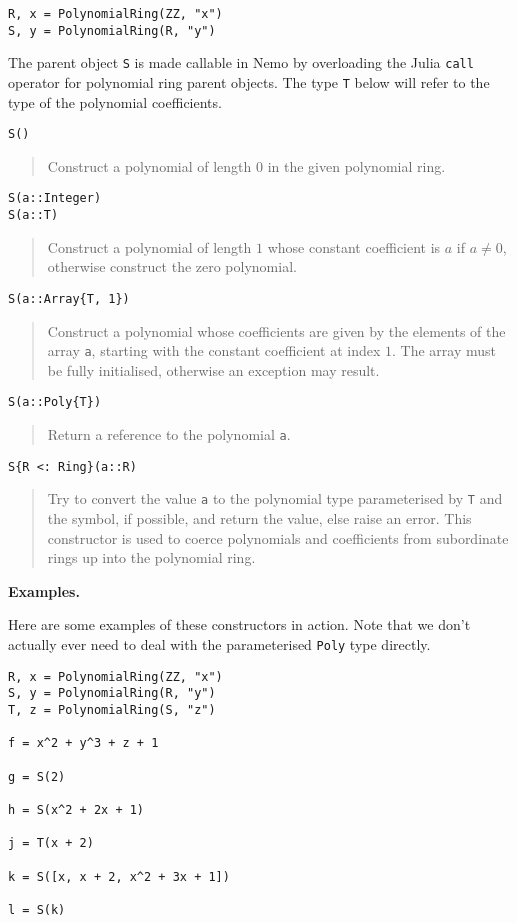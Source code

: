 \documentclass[a4paper,10pt]{article}
\newcommand{\code}{\lstinline}
\newcommand{\desc}[1]{\vspace{-3mm}\begin{quote}#1\end{quote}}
\begin{document}
\begin{lstlisting}
R, x = PolynomialRing(ZZ, "x")
S, y = PolynomialRing(R, "y")
\end{lstlisting}

The parent object \code{S} is made callable in Nemo by overloading the Julia
\code{call} operator for polynomial ring parent objects. The type \code{T}
below will refer to the type of the polynomial coefficients.

\begin{lstlisting}
S()
\end{lstlisting}

\desc{Construct a polynomial of length $0$ in the given polynomial ring.}

\begin{lstlisting}
S(a::Integer)
S(a::T)
\end{lstlisting}

\desc{Construct a polynomial of length $1$ whose constant coefficient is $a$ if
$a \neq 0$, otherwise construct the zero polynomial.}

\begin{lstlisting}
S(a::Array{T, 1})
\end{lstlisting}

\desc{Construct a polynomial whose coefficients are given by the elements of the array
\code{a}, starting with the constant coefficient at index $1$. The array must be fully
initialised, otherwise an exception may result.}

\begin{lstlisting}
S(a::Poly{T})
\end{lstlisting}

\desc{Return a reference to the polynomial \code{a}.}

\begin{lstlisting}
S{R <: Ring}(a::R)
\end{lstlisting}

\desc{Try to convert the value \code{a} to the polynomial type parameterised by 
\code{T} and the symbol, if possible, and return the value, else raise an error. 
This constructor is used to coerce polynomials and coefficients from subordinate rings
up into the polynomial ring.}

\textbf{Examples.}

Here are some examples of these constructors in action. Note that we don't actually
ever need to deal with the parameterised \code{Poly} type directly.

\begin{lstlisting}
R, x = PolynomialRing(ZZ, "x")
S, y = PolynomialRing(R, "y")
T, z = PolynomialRing(S, "z")

f = x^2 + y^3 + z + 1

g = S(2)

h = S(x^2 + 2x + 1)

j = T(x + 2)

k = S([x, x + 2, x^2 + 3x + 1])

l = S(k)
\end{lstlisting}
\end{document}
